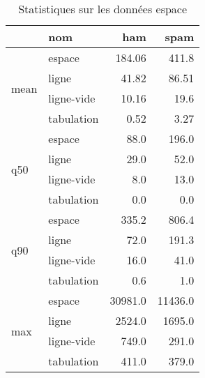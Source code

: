 \begin{table}[H]
\centering
\caption{Statistiques sur les données espace}
\label{tab:f_espace}
\begin{tabular}{ll|rr}
\toprule
 & nom & ham & spam \\
\midrule
\multirow[c]{4}{*}{mean} & espace & 184.06 & 411.8 \\
 & ligne & 41.82 & 86.51 \\
 & ligne-vide & 10.16 & 19.6 \\
 & tabulation & 0.52 & 3.27 \\
\cline{1-4}
\multirow[c]{4}{*}{q50} & espace & 88.0 & 196.0 \\
 & ligne & 29.0 & 52.0 \\
 & ligne-vide & 8.0 & 13.0 \\
 & tabulation & 0.0 & 0.0 \\
\cline{1-4}
\multirow[c]{4}{*}{q90} & espace & 335.2 & 806.4 \\
 & ligne & 72.0 & 191.3 \\
 & ligne-vide & 16.0 & 41.0 \\
 & tabulation & 0.6 & 1.0 \\
\cline{1-4}
\multirow[c]{4}{*}{max} & espace & 30981.0 & 11436.0 \\
 & ligne & 2524.0 & 1695.0 \\
 & ligne-vide & 749.0 & 291.0 \\
 & tabulation & 411.0 & 379.0 \\
\cline{1-4}
\bottomrule
\end{tabular}
\end{table}
